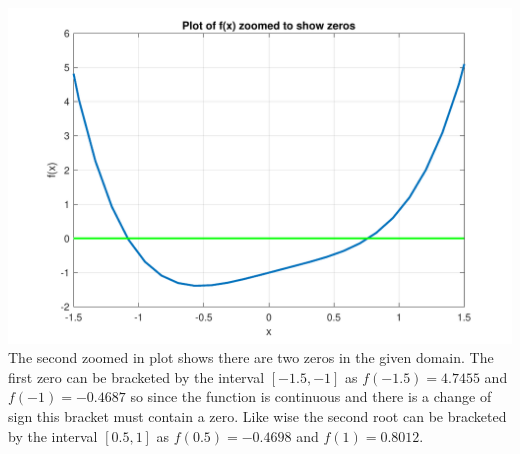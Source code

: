 \documentclass[a4paper,11pt]{article}
\begin{document}
\begin{enumerate}
\begin{enumerate}
{			\includegraphics[scale=0.5]{images/Q1a_i_zoomed.pdf}
		}
			The second zoomed in plot shows there are two zeros in the given 
			domain. The first zero can be bracketed by the interval 
			$[-1.5,-1]$ as 
			$f(-1.5)=4.7455$ and $f(-1)=-0.4687$ so since the function is 
			continuous and there is a change of sign this bracket must 
			contain 
			a zero. Like wise the second root can be bracketed by the 
			interval $[0.5,1]$ 
			as $f(0.5)=-0.4698$ and $f(1)=0.8012$.
			

\end{enumerate}
\end{enumerate}
\end{document}
